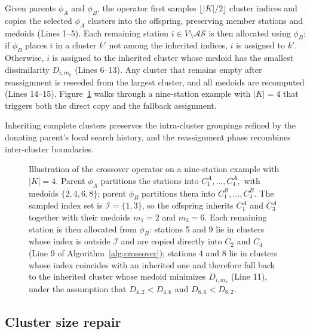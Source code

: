 Given parents \( \phi_A \) and \( \phi_B \), the operator first samples
\(\lfloor |K|/2 \rfloor\) cluster indices and copies the selected
\(\phi_A\) clusters into the offspring, preserving member stations and medoids
(Lines 1--5). Each remaining station \(i\in V\setminus \mathcal{AS}\) is then
allocated using \( \phi_B \): if \( \phi_B \) places \(i\) in a cluster
\(k'\) not among the inherited indices, \(i\) is assigned to \(k'\).
Otherwise, \(i\) is assigned to the inherited cluster whose medoid has the
smallest dissimilarity \(D_{i,m_k}\) (Lines 6--13). Any cluster that remains
empty after reassignment is reseeded from the largest cluster, and all medoids
are recomputed (Lines 14--15). Figure~\ref{ch3:fig:crossover} walks through a
nine-station example with \(|K|=4\) that triggers both the direct copy and the
fallback assignment.

Inheriting complete clusters preserves the intra-cluster groupings refined by the donating parent's local search history, and the reassignment phase recombines inter-cluster boundaries.

\begin{figure}[htbp]
\centering
{}
\caption{Illustration of the crossover operator on a nine-station example with $\left|K\right|=4$. Parent ${{\phi }_{A}}$ partitions the stations into $C_{1}^{A},\ldots ,C_{4}^{A},$ with medoids $\{2,4,6,8\}$; parent ${{\phi }_{B}}$ partitions them into $C_{1}^{B},\ldots ,C_{4}^{B}$. The sampled index set is $\mathcal{I}=\{1,3\}$, so the offspring inherits $C_{1}^{A}$ and $C_{3}^{A}$ together with their medoids ${{m}_{1}}=2$ and ${{m}_{3}}=6$. Each remaining station is then allocated from ${{\phi }_{B}}$: stations 5 and 9 lie in clusters whose index is outside $\mathcal{I}$ and are copied directly into ${{C}_{2}}$ and ${{C}_{4}}$ (Line 9 of Algorithm~\ref{alg:crossover}); stations 4 and 8 lie in clusters whose index coincides with an inherited one and therefore fall back to the inherited cluster whose medoid minimizes ${{D}_{i,{{m}_{k}}}}$ (Line 11), under the assumption that ${{D}_{4,2}}<{{D}_{4,6}}$ and ${{D}_{8,6}}<{{D}_{8,2}}$.}
\label{ch3:fig:crossover}
\end{figure}

\subsection{Cluster size repair}\label{ch3:subsec:cluster-size-repair}

